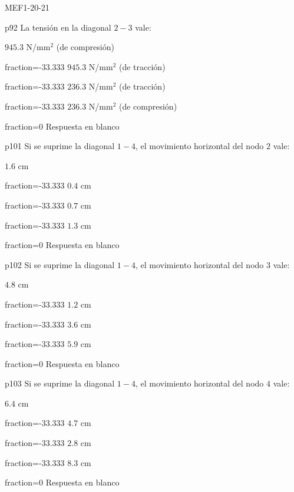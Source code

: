 \documentclass[a4paper]{article}
\begin{document}
\begin{quiz}{MEF1-20-21}
\begin{multi}{p92}
La tensi\'on en la diagonal $2-3$ vale:
	\item* $945.3$ N/mm$^2$ (de compresi\'on)
	\item[fraction=-33.333]  $945.3$ N/mm$^2$ (de tracci\'on)
	\item[fraction=-33.333]  $236.3$ N/mm$^2$ (de tracci\'on)
	\item[fraction=-33.333]  $236.3$ N/mm$^2$ (de compresi\'on)
	\item[fraction=0] Respuesta en blanco
\end{multi}
\begin{multi}{p101}
Si se suprime la diagonal $1-4$, el movimiento horizontal del nodo $2$
vale:
	\item* $1.6$ cm
	\item[fraction=-33.333]  $0.4$ cm
	\item[fraction=-33.333]  $0.7$ cm
	\item[fraction=-33.333]  $1.3$ cm
	\item[fraction=0] Respuesta en blanco
\end{multi}
\begin{multi}{p102}
Si se suprime la diagonal $1-4$, el movimiento horizontal del nodo $3$
vale:
	\item* $4.8$ cm
	\item[fraction=-33.333]  $1.2$ cm
	\item[fraction=-33.333]  $3.6$ cm
	\item[fraction=-33.333]  $5.9$ cm
	\item[fraction=0] Respuesta en blanco
\end{multi}
\begin{multi}{p103}
Si se suprime la diagonal $1-4$, el movimiento horizontal del nodo $4$
vale:
	\item* $6.4$ cm
	\item[fraction=-33.333]  $4.7$ cm
	\item[fraction=-33.333]  $2.8$ cm
	\item[fraction=-33.333]  $8.3$ cm
	\item[fraction=0] Respuesta en blanco
\end{multi}
\end{quiz}
\end{document}
